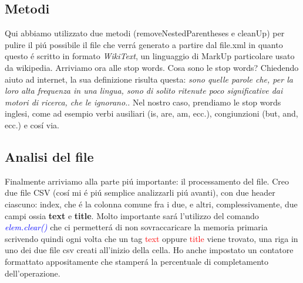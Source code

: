 \documentclass[12pt,a4paper]{article}
\begin{document}
    \subsection{Metodi}
    Qui abbiamo utilizzato due metodi (removeNestedParentheses e cleanUp) per pulire il piú possibile il file che verrá generato a partire dal file.xml in quanto questo é scritto in formato \textit{WikiText}, un linguaggio di MarkUp particolare usato da wikipedia. Arriviamo ora alle stop words. Cosa sono le stop words? Chiedendo aiuto ad internet, la sua definizione risulta questa: \textit{sono quelle parole che, per la loro alta frequenza in una lingua, sono di solito ritenute poco significative dai motori di ricerca, che le ignorano.}. Nel nostro caso, prendiamo le stop words inglesi, come ad esempio verbi ausiliari (is, are, am, ecc.), congiunzioni (but, and, ecc.) e cosí via.
    \subsection{Analisi del file}
    Finalmente arriviamo alla parte piú importante: il processamento del file.
    \newline
    Creo due file CSV (cosí mi é piú semplice analizzarli piú avanti), con due header ciascuno: index, che é la colonna comune fra i due, e altri, complessivamente, due campi ossia \textbf{text} e \textbf{title}. Molto importante sará l'utilizzo del comando \textit{\textcolor{blue}{elem.clear()}} che ci permetterá di non sovraccaricare la memoria primaria scrivendo quindi ogni volta che un tag \textcolor{red}{text} oppure \textcolor{red}{title} viene trovato, una riga in uno dei due file csv creati all'inizio della cella.
    \newline
    Ho anche impostato un contatore formattato appositamente che stamperá la percentuale di completamento dell'operazione.
\end{document}
